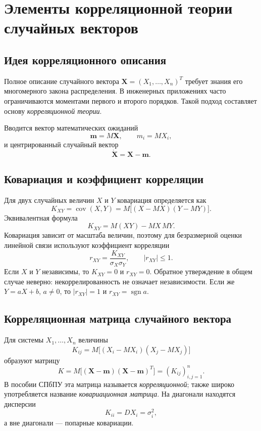 \section{Элементы корреляционной теории случайных векторов}
\label{sec:correlation-random-vectors}

\subsection{Идея корреляционного описания}

Полное описание случайного вектора $\mathbf X=(X_1,\ldots,X_n)^T$ требует
знания его многомерного закона распределения. В инженерных приложениях часто
ограничиваются моментами первого и второго порядков. Такой подход составляет
основу \emph{корреляционной теории}.

Вводится вектор математических ожиданий
\[
    \mathbf m=M\mathbf X,
    \qquad m_i=MX_i,
\]
и центрированный случайный вектор
\[
    \mathring{\mathbf X}=\mathbf X-\mathbf m.
\]

\subsection{Ковариация и коэффициент корреляции}

Для двух случайных величин $X$ и $Y$ ковариация определяется как
\[
    K_{XY}=\operatorname{cov}(X,Y)
    =M\bigl[(X-MX)(Y-MY)\bigr].
\]
Эквивалентная формула
\[
    K_{XY}=M(XY)-MX\,MY.
\]
Ковариация зависит от масштаба величин, поэтому для безразмерной оценки
линейной связи используют коэффициент корреляции
\[
    r_{XY}=\frac{K_{XY}}{\sigma_X\sigma_Y},
    \qquad |r_{XY}|\leq1.
\]
Если $X$ и $Y$ независимы, то $K_{XY}=0$ и $r_{XY}=0$. Обратное утверждение
в общем случае неверно: некоррелированность не означает независимости.
Если же $Y=aX+b$, $a\neq0$, то $|r_{XY}|=1$ и $r_{XY}=\operatorname{sgn}a$.

\subsection{Корреляционная матрица случайного вектора}

Для системы $X_1,\ldots,X_n$ величины
\[
    K_{ij}=M\bigl[(X_i-MX_i)(X_j-MX_j)\bigr]
\]
образуют матрицу
\[
    K=M\bigl[(\mathbf X-\mathbf m)(\mathbf X-\mathbf m)^T\bigr]
      =(K_{ij})_{i,j=1}^n.
\]
В пособии СПбПУ эта матрица называется \emph{корреляционной}; также широко
употребляется название \emph{ковариационная матрица}. На диагонали находятся
дисперсии
\[
    K_{ii}=DX_i=\sigma_i^2,
\]
а вне диагонали --- попарные ковариации.

